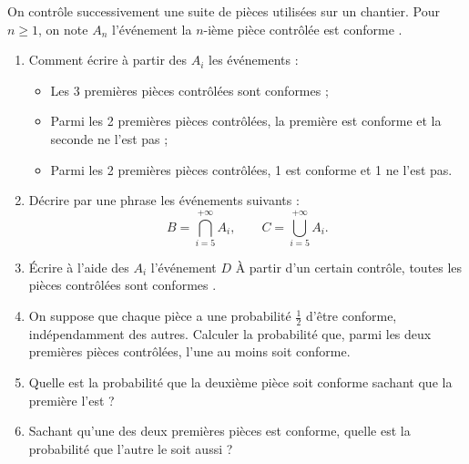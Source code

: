 

\begin{Enonce}
On contrôle successivement une suite de pièces utilisées sur un chantier. Pour $n \geq 1$, on note $A_n$ l'événement \og la $n$-ième pièce contrôlée est conforme \fg.
\begin{enumerate}
    \item Comment écrire à partir des $A_i$ les événements :
    \begin{itemize}
        \item Les 3 premières pièces contrôlées sont conformes ;
        \item Parmi les 2 premières pièces contrôlées, la première est conforme et la seconde ne l'est pas ;
        \item Parmi les 2 premières pièces contrôlées, 1 est conforme et 1 ne l'est pas.
    \end{itemize}

    \item Décrire par une phrase les événements suivants :
    $$
    B=\bigcap_{i=5}^{+\infty} A_i, \qquad  C=\bigcup_{i=5}^{+\infty} A_i.
    $$

    \item Écrire à l'aide des $A_i$ l'événement $D$ \og À partir d'un certain contrôle, toutes les pièces contrôlées sont conformes \fg.

    \item On suppose que chaque pièce a une probabilité $\frac{1}{2}$ d'être conforme, indépendamment des autres. Calculer la probabilité que, parmi les deux premières pièces contrôlées, l'une au moins soit conforme.

    \item Quelle est la probabilité que la deuxième pièce soit conforme sachant que la première l'est ?

    \item Sachant qu'une des deux premières pièces est conforme, quelle est la probabilité que l'autre le soit aussi ?
\end{enumerate}
\end{Enonce}

